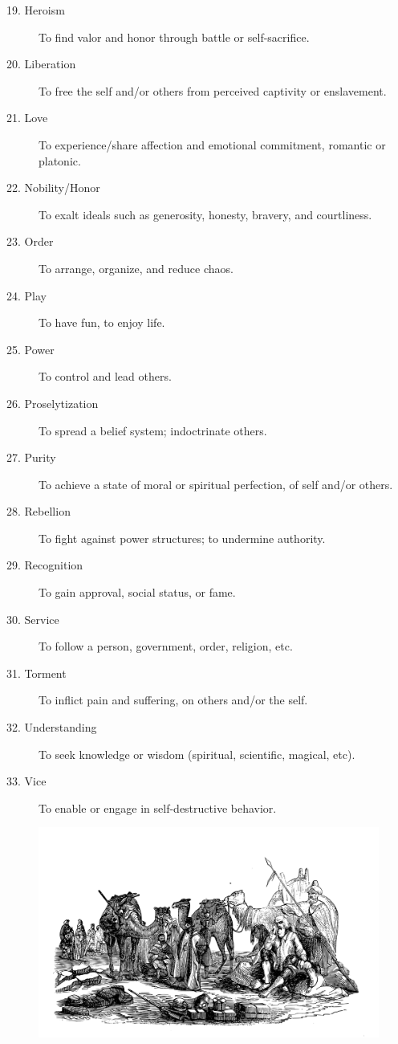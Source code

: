 \documentclass[12pt]{book}
\begin{document}
\begin{description}
    \item[19. Heroism] To find valor and honor through battle or self-sacrifice.
    \item[20. Liberation] To free the self and/or others from perceived captivity or enslavement.
    \item[21. Love] To experience/share affection and emotional commitment, romantic or platonic.
    \item[22. Nobility/Honor] To exalt ideals such as generosity, honesty, bravery, and courtliness.
    \item[23. Order] To arrange, organize, and reduce chaos.
    \item[24. Play] To have fun, to enjoy life.
    \item[25. Power] To control and lead others.
    \item[26. Proselytization] To spread a belief system; indoctrinate others.
    \item[27. Purity] To achieve a state of moral or spiritual perfection, of self and/or others.
    \item[28. Rebellion] To fight against power structures; to undermine authority.
    \item[29. Recognition] To gain approval, social status, or fame.
    \item[30. Service] To follow a person, government, order, religion, etc.
    \item[31. Torment] To inflict pain and suffering, on others and/or the self.
    \item[32. Understanding] To seek knowledge or wisdom (spiritual, scientific, magical, etc).
    \item[33. Vice] To enable or engage in self-destructive behavior.
\end{description}

\begin{figure}[h]
    \centering
    \includegraphics[width=\textwidth]{./images/personality02.pdf}
\end{figure}
\end{document}
